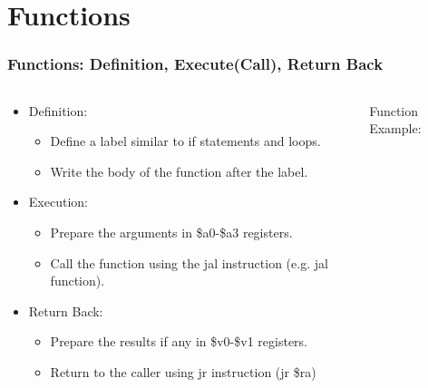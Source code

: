 \documentclass[
	10pt, %
	hmargin=1cm,vmargin=0cm,head=0.5cm,headsep=0pt,foot=0.5cm,margin=2cm
]{beamer}
\begin{document}
\section{Functions} 
\begin{frame}
	\frametitle{Functions: Definition, Execute(Call), Return Back}
	\begin{columns}[c]
		\begin{column}{0.55\textwidth}
			\begin{itemize}
				\item Definition:
				\begin{itemize}
					\item Define a label similar to if statements and loops.
					\item Write the body of the function after the label. \pause
				\end{itemize}
				\item Execution:
				\begin{itemize}
					\item Prepare the arguments in \color{red}\$a0\color{black}-\color{red}\$a3 \color{black}registers.
					\item Call the function using the \color{blue}jal \color{black}instruction (e.g. \color{blue}jal \color{black}function).			\pause
				\end{itemize}
				\item Return Back:
				\begin{itemize}
					\item Prepare the results if any in \color{red}\$v0\color{black}-\color{red}\$v1 \color{black}registers.
					\item Return to the caller using \color{blue}jr \color{black}instruction (\color{blue}jr \color{red}\$ra\color{black})			\pause
				\end{itemize}
			\end{itemize}
		\end{column}
		\begin{column}{0.45\textwidth}
			Function Example: 
		\end{column}
	\end{columns}
\end{frame}
\end{document}
